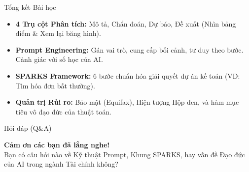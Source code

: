 \documentclass[aspectratio=169,12pt]{beamer}
\begin{document}
\begin{frame}{Tổng kết Bài học}
    \begin{itemize}
        \item \textbf{4 Trụ cột Phân tích:} Mô tả, Chẩn đoán, Dự báo, Đề xuất (Nhìn bảng điểm \& Xem lại băng hình).
        \item \textbf{Prompt Engineering:} Gán vai trò, cung cấp bối cảnh, tư duy theo bước. Cảnh giác với số học của AI.
        \item \textbf{SPARKS Framework:} 6 bước chuẩn hóa giải quyết dự án kế toán (VD: Tìm hóa đơn bất thường).
        \item \textbf{Quản trị Rủi ro:} Bảo mật (Equifax), Hiện tượng Hộp đen, và hàm mục tiêu vô đạo đức của thuật toán.
    \end{itemize}
\end{frame}

\begin{frame}{Hỏi đáp (Q\&A)}
    \begin{center}
        \Large \textbf{Cảm ơn các bạn đã lắng nghe!}\\
        \vspace{1cm}
        Bạn có câu hỏi nào về Kỹ thuật Prompt, Khung SPARKS, hay vấn đề Đạo đức của AI trong ngành Tài chính không?
    \end{center}
\end{frame}
\end{document}
